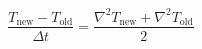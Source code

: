 \documentclass[preview]{standalone}
\begin{document}
\setcounter{equation}{9}
\begin{equation}
    \frac{T_{\text{new}} - T_{\text{old}}}{\Delta t} = \frac{\nabla^2 T_{\text{new}} + \nabla^2 T_{\text{old}}}{2}
\end{equation}
\end{document}

